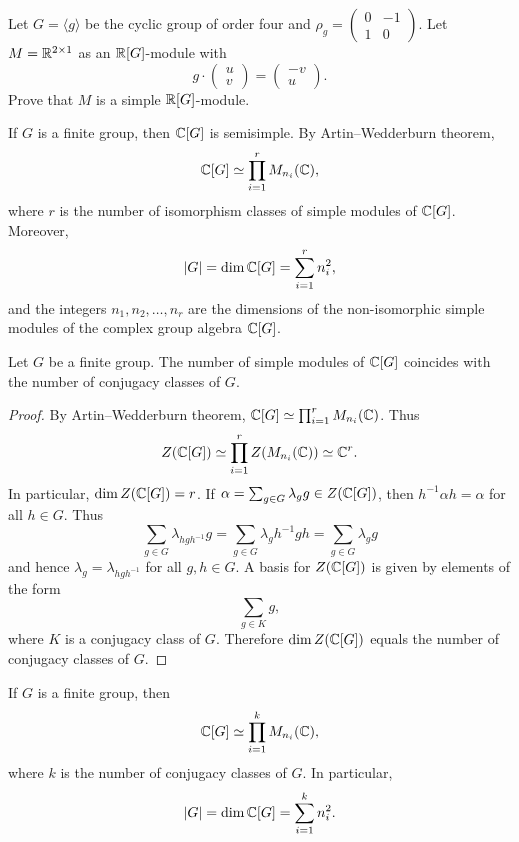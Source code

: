 \begin{exercise}
Let $G=\langle g\rangle$ be the cyclic group 
of order four and $\rho_g=\begin{pmatrix}
0&-1\\
1&0\end{pmatrix}$. 
Let $M=\mathbb{R}^{2\times 1}$ as an $\mathbb{R}[G]$-module with 
\[
g\cdot\begin{pmatrix}u\\v\end{pmatrix}
=\begin{pmatrix}-v\\u\end{pmatrix}.
\]
Prove that $M$ is a simple $\mathbb{R}[G]$-module. 
\end{exercise}

If $G$ is a finite group, 
then $\mathbb{C}[G]$ is semisimple. By Artin--Wedderburn theorem, 
\[
\mathbb{C}[G]\simeq\prod_{i=1}^r M_{n_i}(\mathbb{C}),
\]
where $r$ is the number of isomorphism classes of simple modules of $\mathbb{C}[G]$. Moreover, 
\[
|G|=\dim\mathbb{C}[G]=\sum_{i=1}^r n_i^2,
\]
and the integers 
$n_1,n_2,\dots,n_r$ are
the dimensions of the non-isomorphic simple modules of
the complex group algebra 
$\mathbb{C}[G]$. 

\begin{theorem}
    Let $G$ be a finite group. The number of simple 
    modules of $\mathbb{C}[G]$ coincides with the number of conjugacy classes of $G$. 
\end{theorem}

\begin{proof}
    By Artin--Wedderburn theorem, $\mathbb{C}[G]\simeq\prod_{i=1}^rM_{n_i}(\mathbb{C})$. Thus 
    \[
		Z(\mathbb{C}[G])\simeq\prod_{i=1}^rZ(M_{n_i}(\mathbb{C}))\simeq\mathbb{C}^r.
	\]
	In particular, $\dim Z(\mathbb{C}[G])=r$. If $\alpha=\sum_{g\in
	G}\lambda_gg\in Z(\mathbb{C}[G])$, then $h^{-1}\alpha h=\alpha$ for all $h\in
	G$. Thus 
	\[
		\sum_{g\in G}\lambda_{hgh^{-1}}g=
		\sum_{g\in G}\lambda_g h^{-1}gh=\sum_{g\in G}\lambda_gg
	\]
	and hence $\lambda_{g}=\lambda_{hgh^{-1}}$ for all $g,h\in G$. A basis for 
	$Z(\mathbb{C}[G])$ is given by elements of the form 
	\[
		\sum_{g\in K}g,
	\]
	where $K$ is a conjugacy class of $G$. Therefore $\dim Z(\mathbb{C}[G])$ equals 
	the number of conjugacy classes of $G$.
\end{proof}

If $G$ is a finite group,
then 
\[
\mathbb{C}[G]\simeq \prod_{i=1}^k M_{n_i}(\mathbb{C}),
\]
where $k$ is the number of conjugacy classes of $G$. 
In particular, 
\[
|G|=\dim\mathbb{C}[G]=\sum_{i=1}^k n_i^2.
\]

